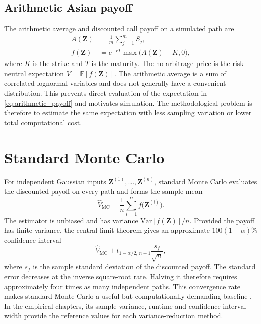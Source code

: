 \subsection{Arithmetic Asian payoff}

The arithmetic average and discounted call payoff on a simulated path are
\begin{align}
A(\mathbf{Z}) &= \frac{1}{m} \sum_{j=1}^{m} S_j,
\label{eq:arithmetic_average}\\
f(\mathbf{Z}) &= e^{-rT} \max\bigl(A(\mathbf{Z}) - K, 0\bigr),
\label{eq:arithmetic_payoff}
\end{align}
where $K$ is the strike and $T$ is the maturity. The no-arbitrage price is the risk-neutral expectation $V = \mathbb{E}[f(\mathbf{Z})]$. The arithmetic average is a sum of correlated lognormal variables and does not generally have a convenient distribution. This prevents direct evaluation of the expectation in \eqref{eq:arithmetic_payoff} and motivates simulation. The methodological problem is therefore to estimate the same expectation with less sampling variation or lower total computational cost.

\section{Standard Monte Carlo}

For independent Gaussian inputs $\mathbf{Z}^{(1)}, \ldots, \mathbf{Z}^{(n)}$, standard Monte Carlo evaluates the discounted payoff on every path and forms the sample mean
\begin{equation}
\hat{V}_{\mathrm{MC}} = \frac{1}{n} \sum_{i=1}^{n} f\bigl(\mathbf{Z}^{(i)}\bigr).
\label{eq:mc_estimator}
\end{equation}
The estimator is unbiased and has variance $\mathrm{Var}[f(\mathbf{Z})]/n$. Provided the payoff has finite variance, the central limit theorem gives an approximate $100(1 - \alpha)\%$ confidence interval
\begin{equation}
\hat{V}_{\mathrm{MC}} \pm t_{1-\alpha/2,\,n-1} \frac{s_f}{\sqrt{n}},
\label{eq:mc_ci}
\end{equation}
where $s_f$ is the sample standard deviation of the discounted payoff. The standard error decreases at the inverse square-root rate. Halving it therefore requires approximately four times as many independent paths. This convergence rate makes standard Monte Carlo a useful but computationally demanding baseline \parencite{boyle_1977,glasserman_2004}. In the empirical chapters, its sample variance, runtime and confidence-interval width provide the reference values for each variance-reduction method.

